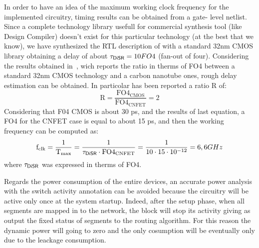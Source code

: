 In order to have an idea of the maximum working clock frequency for
the implemented circuitry, timing results can be obtained from a gate-
level netlist. Since a complete technology library usefull for
commercial synthesis tool (like Design Compiler) doesn't exist for 
this particular technology (at the best that we know), we have
synthesized the RTL description of \disr{} with a standard 32nm CMOS
library obtaining  a delay of about $\mathrm{\tau_{{\sf DiSR}{}}=10} FO4$
(fan-out of four). Considering the results obtained
in~\cite{deng_isscc07}, wich reports the ratio in therms of FO4
between a standard 32nm CMOS technology and a carbon nanotube ones, 
rough delay estimation can be obtained. In particolar has been reported a
ratio R of:  
\begin{equation}
\mathrm{R=\frac{FO4_{CMOS}}{FO4_{CNFET}}=2}  
\end{equation}
Considering that F04 CMOS is about 30 ps, and the results of last
equation, a FO4 for the CNFET case is equal to about 15 ps, and
then the working frequency can be computed as:
\begin{equation}
\mathrm{f_{clk}=\frac{1}{T_{max}}=\frac{1}{\tau_{{\sf DiSR}{}} \cdot FO4_{CNFET}}}=
\frac{1}{10\cdot 15 \cdot 10^{-12}}=6,6 GHz
\end{equation}
where $\mathrm{\tau_{{\sf DiSR}{}}}$ was expressed in therms of FO4.

Regards the power consumption of the entire \disr{} devices, 
an accurate power analysis with the switch activity
annotation can be avoided because the \disr{} circuitry will be active 
only once at the system startup. Indeed, after the setup phase, when all segments
are mapped in to the network, the \disr{} block will stop its activity
giving as output the fixed status of segments to the routing
algorithm. For this reason the dynamic power will going  to zero and
the only cosumption will be eventually only due to the leackage
consumption.
